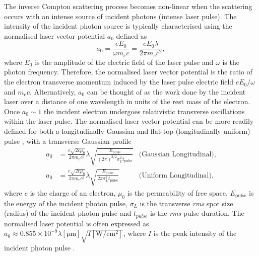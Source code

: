 \documentclass[../main.tex]{subfiles}
\begin{document}
The inverse Compton scattering process becomes non-linear when the scattering occurs with an intense source of incident photons (intense laser pulse). The intensity of the incident photon source is typically characterised using the normalised laser vector potential $a_{0}$ defined as 
\begin{equation}
a_{0} = \frac{eE_{0}}{\omega m_{e}c} = \frac{eE_{0}\lambda}{2\pi m_{e}c^{2}},
\label{eq:a_0_momentum}    
\end{equation}
where $E_{0}$ is the amplitude of the electric field of the laser pulse and $\omega$ is the photon frequency. Therefore, the normalised laser vector potential is the ratio of the electron transverse momentum induced by the laser pulse electric field $eE_{0}/\omega$ and $m_{e}c$. Alternatively, $a_{0}$ can be thought of as the work done by the incident laser over a distance of one wavelength in units of the rest mass of the electron. Once $a_{0} \sim 1$ the incident electron undergoes relativistic transverse oscillations within the laser pulse. The normalised laser vector potential can be more readily defined for both a longitudinally Gaussian and flat-top (longitudinally uniform) pulse \cite{terzic2019improving}, with a transverse Gaussian profile
\begin{align}
a_{0} &= \frac{e\sqrt{2c\mu_{0}}}{2\pi m_{e}c^{2}}\lambda\sqrt{\frac{E_{\mathrm{pulse}}}{\left(2\pi\right)^{3/2}\sigma_{L}^{2}t_{\mathrm{pulse}}}} & \text{(Gaussian Longitudinal)},
\label{eq:a0_gaussian} \\
a_{0} &= \frac{e\sqrt{2c\mu_{0}}}{2\pi m_{e}c^{2}}\lambda\sqrt{\frac{E_{\mathrm{pulse}}}{2\pi\sigma_{L}^{2}t_{\mathrm{pulse}}}} & \text{(Uniform Longitudinal)},
\label{eq:a0_flat_top}
\end{align}
where $e$ is the charge of an electron, $\mu_{0}$ is the permeability of free space, $E_{\mathrm{pulse}}$ is the energy of the incident photon pulse, $\sigma_{L}$ is the transverse \textit{rms} spot size (radius) of the incident photon pulse and $t_{pulse}$ is the \textit{rms} pulse duration. The normalised laser potential is often expressed as $a_{0} \approx 0.855\times 10^{-9} \lambda\left[\mathrm{\mu m}\right]\sqrt{I\left[\mathrm{W/cm^{2}}\right]}$, where $I$ is the peak intensity of the incident photon pulse \cite{li2004high}.
\end{document}
